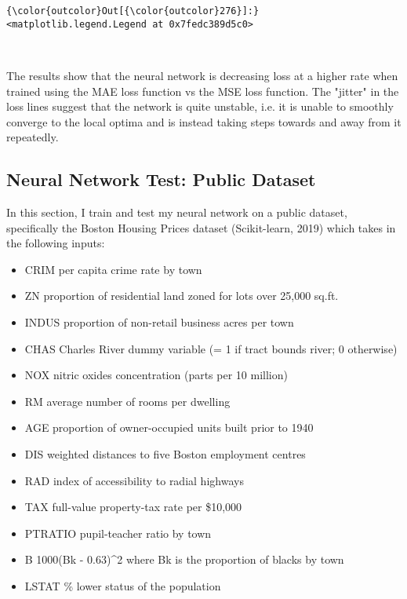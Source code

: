 \documentclass[11pt]{article}
\providecommand{\tightlist}{%
      \setlength{\itemsep}{0pt}\setlength{\parskip}{0pt}}
\begin{document}
\begin{Verbatim}[commandchars=\\\{\}]
{\color{outcolor}Out[{\color{outcolor}276}]:} <matplotlib.legend.Legend at 0x7fedc389d5c0>
\end{Verbatim}
            
    \begin{center}
    \end{center}
    { \hspace*{\fill} \\}
    
    The results show that the neural network is decreasing loss at a higher
rate when trained using the MAE loss function vs the MSE loss function.
The "jitter" in the loss lines suggest that the network is quite
unstable, i.e. it is unable to smoothly converge to the local optima and
is instead taking steps towards and away from it repeatedly.

    \subsection{Neural Network Test: Public
Dataset}\label{neural-network-test-public-dataset}

In this section, I train and test my neural network on a public dataset,
specifically the Boston Housing Prices dataset (Scikit-learn, 2019)
which takes in the following inputs:

\begin{itemize}
\tightlist
\item
  CRIM per capita crime rate by town
\item
  ZN proportion of residential land zoned for lots over 25,000 sq.ft.
\item
  INDUS proportion of non-retail business acres per town
\item
  CHAS Charles River dummy variable (= 1 if tract bounds river; 0
  otherwise)
\item
  NOX nitric oxides concentration (parts per 10 million)
\item
  RM average number of rooms per dwelling
\item
  AGE proportion of owner-occupied units built prior to 1940
\item
  DIS weighted distances to five Boston employment centres
\item
  RAD index of accessibility to radial highways
\item
  TAX full-value property-tax rate per \$10,000
\item
  PTRATIO pupil-teacher ratio by town
\item
  B 1000(Bk - 0.63)\^{}2 where Bk is the proportion of blacks by town
\item
  LSTAT \% lower status of the population
\end{itemize}
\end{document}
